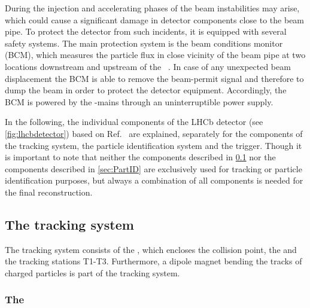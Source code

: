 During the injection and accelerating phases of the \lhc beam instabilities may arise, which could cause a significant damage in detector components close to the beam pipe.
To protect the detector from such incidents, it is equipped with several safety systems.
The main protection system is the beam conditions monitor (BCM), which measures the particle flux in close vicinity of the beam pipe at two locations downstream and upstream of the \velo~\cite{Ilgner:2010vu}.
In case of any unexpected beam displacement the BCM is able to remove the beam-permit signal and therefore to dump the \lhc beam in order to protect the detector equipment.
Accordingly, the BCM is powered by the \lhc-mains through an uninterruptible power supply.

In the following, the individual components of the LHCb detector (see \cref{fig:lhcbdetector}) based on Ref.~\cite{Alves:2008zz} are explained, separately for the components of the tracking system, the particle identification system and the \lhcb trigger. Though it is important to note that neither the components described in \cref{sec:tracking} nor the components described in \cref{sec:PartID} are exclusively used for tracking or particle identification purposes, but always a combination of all components is needed for the final reconstruction.

\subsection{The tracking system}
\label{sec:tracking}

The tracking system consists of the \velo, which encloses the collision point, the \ttracker and the tracking stations T1-T3.
Furthermore, a dipole magnet bending the tracks of charged particles is part of the tracking system.

\subsubsection*{The \velo}
\label{sec:velo}

